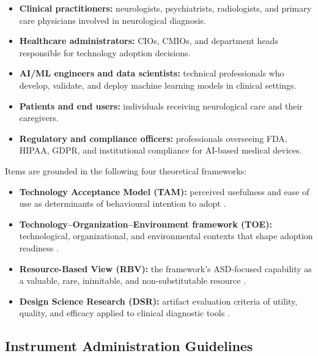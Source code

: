 \begin{itemize}[leftmargin=*, itemsep=3pt]
    \item \textbf{Clinical practitioners:} neurologists, psychiatrists, radiologists, and primary care physicians involved in neurological diagnosis.
    \item \textbf{Healthcare administrators:} CIOs, CMIOs, and department heads responsible for technology adoption decisions.
    \item \textbf{AI/ML engineers and data scientists:} technical professionals who develop, validate, and deploy machine learning models in clinical settings.
    \item \textbf{Patients and end users:} individuals receiving neurological care and their caregivers.
    \item \textbf{Regulatory and compliance officers:} professionals overseeing FDA, HIPAA, GDPR, and institutional compliance for AI-based medical devices.
\end{itemize}

\noindent Items are grounded in the following four theoretical frameworks:

\begin{itemize}[leftmargin=*, itemsep=3pt]
    \item \textbf{Technology Acceptance Model (TAM):} perceived usefulness and ease of use as determinants of behavioural intention to adopt \cite{davis1989tam}.
    \item \textbf{Technology--Organization--Environment framework (TOE):} technological, organizational, and environmental contexts that shape adoption readiness \cite{tornatzky1990processes}.
    \item \textbf{Resource-Based View (RBV):} the framework's ASD-focused capability as a valuable, rare, inimitable, and non-substitutable resource \cite{barney1991firm}.
    \item \textbf{Design Science Research (DSR):} artifact evaluation criteria of utility, quality, and efficacy applied to clinical diagnostic tools \cite{hevner2004design}.
\end{itemize}

\subsection{Instrument Administration Guidelines}
\label{subsec:survey_admin}


